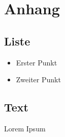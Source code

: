 \chapter*{Anhang}
\label{sec:anhang}

\section{Liste}
\begin{itemize}
   	 \item{Erster Punkt}
   	 \item{Zweiter Punkt}
\end{itemize}

\section{Text}
Lorem Ipsum 